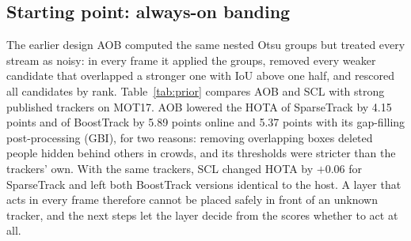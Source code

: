 \documentclass[pdflatex,sn-mathphys-num,iicol]{sn-jnl}
\newcommand{\scl}{SCL}
\newcommand{\aob}{AOB}
\begin{document}
\subsection{Starting point: always-on banding}\label{sec:prior}
The earlier design \aob{} computed the same nested Otsu groups but treated every stream as noisy:
in every frame it applied the groups, removed every weaker candidate that overlapped a stronger one
with IoU above one half, and rescored all candidates by rank. Table~\ref{tab:prior} compares \aob{}
and \scl{} with strong published trackers on MOT17. \aob{} lowered the HOTA of SparseTrack by 4.15
points and of BoostTrack by 5.89 points online and 5.37 points with its gap-filling post-processing
(GBI), for two reasons: removing overlapping boxes deleted people hidden behind others in crowds,
and its thresholds were stricter than the trackers' own. With the same trackers, \scl{} changed
HOTA by $+0.06$ for SparseTrack and left both BoostTrack versions identical to the host. A layer
that acts in every frame therefore cannot be placed safely in front of an unknown tracker, and the
next steps let the layer decide from the scores whether to act at all.
\end{document}
